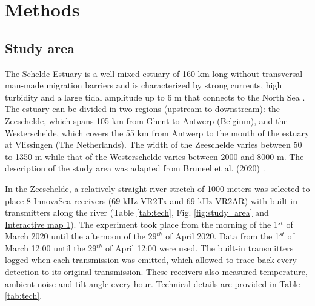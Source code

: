 \documentclass[doublespacing,linenumbers]{bmcart}
\begin{document}
\section*{Methods}

\subsection*{Study area}

The Schelde Estuary is a well-mixed estuary of 160 km long without transversal man-made migration barriers and is characterized by strong currents, high turbidity and a large tidal amplitude up to 6 m that connects to the North Sea \cite{Cornet2016}. The estuary can be divided in two regions (upstream to downstream): the Zeeschelde, which spans 105 km from Ghent to Antwerp (Belgium), and the Westerschelde, which covers the 55 km from Antwerp to the mouth of the estuary at Vlissingen (The Netherlands). The width of the Zeeschelde varies between 50 to 1350 m while that of the Westerschelde varies between 2000 and 8000 m. The description of the study area was adapted from Bruneel et al. (2020) \cite{Bruneel2020QuantifyingSystems}. 

In the Zeeschelde, a relatively straight river stretch of 1000 meters was selected to place 8 InnovaSea receivers (69 kHz VR2Tx and 69 kHz VR2AR) with built-in transmitters along the river (Table \ref{tab:tech}, Fig. \ref{fig:study_area} and \href{http://rpubs.com/spbruneel/Receiver_loc_DR_ZS}{Interactive map 1}). The experiment took place from the morning of the 1$^{st}$ of March 2020 until the afternoon of the 29$^{th}$ of April 2020. Data from the 1$^{st}$ of March 12:00 until the 29$^{th}$ of April 12:00 were used. The built-in transmitters logged when each transmission was emitted, which allowed to trace back every detection to its original transmission. These receivers also measured temperature, ambient noise and tilt angle every hour. Technical details are provided in Table \ref{tab:tech}.  
\end{document}
